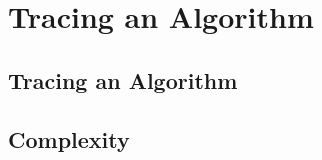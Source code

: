 \documentclass[../alevelmaths.tex]{subfiles}
\begin{document}
\chapter{Tracing an Algorithm}
\section{Tracing an Algorithm}
\section{Complexity}
\end{document}
